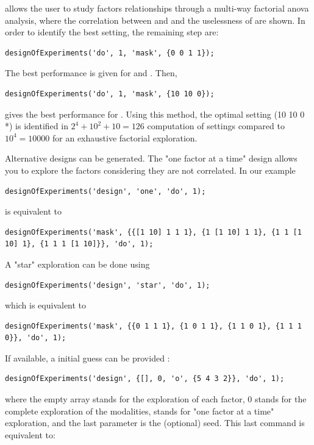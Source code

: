 \documentclass[a4paper,fleqn]{tufte-handout}
\begin{document}
allows the user to study factors relationships through a multi-way factorial anova analysis, where the correlation between  and  and the uselessness of  are shown. In order to identify the best setting, the remaining step are:

\begin{lstlisting}
designOfExperiments('do', 1, 'mask', {0 0 1 1});
\end{lstlisting}

The best performance is given for   and  . Then,

\begin{lstlisting}
designOfExperiments('do', 1, 'mask', {10 10 0});
\end{lstlisting}

gives the best performance for . Using this method, the optimal setting (10 10 0 *) is identified in $2^4+10^2+10 = 126$ computation of settings compared to $10^4 = 10000$ for an exhaustive factorial exploration.


Alternative designs can be generated. The "one factor at a time" design allows you to explore the factors considering they are not correlated. In our example

\begin{lstlisting}
designOfExperiments('design', 'one', 'do', 1);
\end{lstlisting}

is equivalent to

\begin{lstlisting}
designOfExperiments('mask', {{[1 10] 1 1 1}, {1 [1 10] 1 1}, {1 1 [1 10] 1}, {1 1 1 [1 10]}}, 'do', 1);
\end{lstlisting}

A "star" exploration can be done using

\begin{lstlisting}
designOfExperiments('design', 'star', 'do', 1);
\end{lstlisting}

which is equivalent to

\begin{lstlisting}
designOfExperiments('mask', {{0 1 1 1}, {1 0 1 1}, {1 1 0 1}, {1 1 1 0}}, 'do', 1);
\end{lstlisting}

If available, a initial guess can be provided :

\begin{lstlisting}
designOfExperiments('design', {[], 0, 'o', {5 4 3 2}}, 'do', 1);
\end{lstlisting}
where the empty array stands for the exploration of each factor, 0 stands for the complete exploration of the modalities,  stands for "one factor at a time" exploration, and the last parameter is the (optional) seed. This last command is equivalent to:
\end{document}
